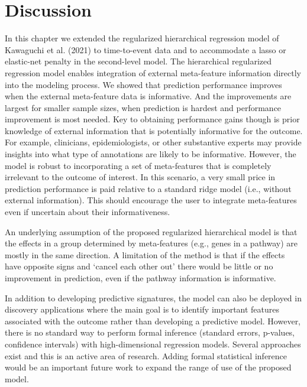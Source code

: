 \section{Discussion}
In this chapter we extended the regularized hierarchical regression model of Kawaguchi et al. (2021) to time-to-event data and to accommodate a lasso or elastic-net penalty in the second-level model. The hierarchical regularized regression model enables integration of external meta-feature information directly into the modeling process.  We showed that prediction performance improves when the external meta-feature data is informative. And the improvements are largest for smaller sample sizes, when prediction is hardest and performance improvement is most needed. Key to obtaining performance gains though is prior knowledge of external information that is potentially informative for the outcome. For example, clinicians, epidemiologists, or other substantive experts may provide insights into what type of annotations are likely to be informative.  However, the model is robust to incorporating a set of meta-features that is completely irrelevant to the outcome of interest.  In this scenario, a very small price in prediction performance is paid relative to a standard ridge model (i.e., without external information). This should encourage the user to integrate meta-features even if uncertain about their informativeness.

An underlying assumption of the proposed regularized hierarchical model is that the effects in a group determined by meta-features (e.g., genes in a pathway) are mostly in the same direction. A limitation of the method is that if the effects have opposite signs and ‘cancel each other out’ there would be little or no improvement in prediction, even if the pathway information is informative.

In addition to developing predictive signatures, the model can also be deployed in discovery applications where the main goal is to identify important features associated with the outcome rather than developing a predictive model. However, there is no standard way to perform formal inference (standard errors, p-values, confidence intervals) with high-dimensional regression models. Several approaches exist \citep{meinshausen2009p, shah2013variable} and this is an active area of research. Adding formal statistical inference would be an important future work to expand the range of use of the proposed model. 


